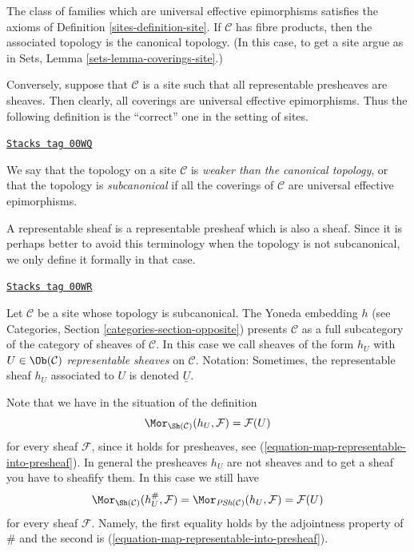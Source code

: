 The class of families which are universal effective epimorphisms
satisfies the axioms of Definition \ref{sites-definition-site}.
If $\mathcal{C}$ has fibre products, then the associated topology is
the canonical topology. (In this case, to get a site argue as in Sets,
Lemma \ref{sets-lemma-coverings-site}.)

\medskip\noindent
Conversely, suppose that $\mathcal{C}$ is a site such that
all representable presheaves are sheaves. Then clearly, all
coverings are universal effective epimorphisms.
Thus the following definition is the ``correct'' one in the
setting of sites.

\begin{definition}
\label{sites-definition-weaker-than-canonical}
\href{https://stacks.math.columbia.edu/tag/00WQ}{\texttt{Stacks tag 00WQ}}

We say that the topology on a site $\mathcal{C}$ is
{\it weaker than the canonical topology}, or that the topology is
{\it subcanonical} if all the coverings
of $\mathcal{C}$ are universal effective epimorphisms.
\end{definition}

A representable sheaf is a representable presheaf which is also a
sheaf. Since it is perhaps better to avoid this terminology when the
topology is not subcanonical, we only define it formally in that case.

\begin{definition}
\label{sites-definition-representable-sheaf}
\href{https://stacks.math.columbia.edu/tag/00WR}{\texttt{Stacks tag 00WR}}

Let $\mathcal{C}$ be a site whose topology is subcanonical.
The Yoneda embedding $h$ (see
Categories, Section \ref{categories-section-opposite})
presents $\mathcal{C}$ as a full subcategory of the
category of sheaves of $\mathcal{C}$. In this case
we call sheaves of the form $h_U$ with $U \in \Ob(\mathcal{C})$
{\it representable sheaves} on $\mathcal{C}$.
Notation: Sometimes, the representable sheaf $h_U$ associated to $U$ is
denoted {\it $\underline{U}$}.
\end{definition}

Note that we have in the situation of the definition
$$
\Mor_{\Sh(\mathcal{C})}(h_U, \mathcal{F}) = \mathcal{F}(U)
$$
for every sheaf $\mathcal{F}$, since it holds for presheaves, see
(\ref{equation-map-representable-into-presheaf}). In general the
presheaves $h_U$ are not sheaves and to get a sheaf you have to
sheafify them. In this case we still have
\begin{equation}
\label{equation-map-representable-into-sheaf}
\Mor_{\Sh(\mathcal{C})}(h_U^\#, \mathcal{F}) =
\Mor_{\textit{PSh}(\mathcal{C})}(h_U, \mathcal{F}) =
\mathcal{F}(U)
\end{equation}
for every sheaf $\mathcal{F}$. Namely, the first equality holds
by the adjointness property of $\#$ and the second is
(\ref{equation-map-representable-into-presheaf}).

